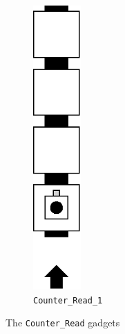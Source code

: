 \begin{figure}[H]
\begin{subfigure}[t]{0.2\textwidth}
        \includegraphics[width=0.2\textwidth]{counter_read_1}
        \caption{\label{fig:counter_read_1} {\tt Counter\_Read\_1}}
    \end{subfigure}%
    \caption{\label{fig:counter_read} The {\tt Counter\_Read} gadgets}
\end{figure}
